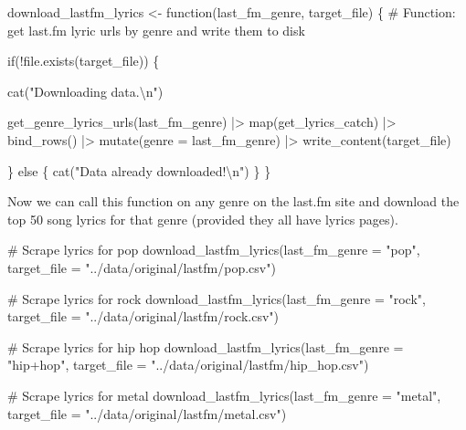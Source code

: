 \documentclass[
  letterpaper,
]{latex/krantz}
\newenvironment{Shaded}{\begin{snugshade}}{\end{snugshade}}
\newcommand{\AttributeTok}[1]{\textcolor[rgb]{0.40,0.45,0.13}{#1}}
\newcommand{\CommentTok}[1]{\textcolor[rgb]{0.37,0.37,0.37}{#1}}
\newcommand{\ControlFlowTok}[1]{\textcolor[rgb]{0.00,0.23,0.31}{#1}}
\newcommand{\FunctionTok}[1]{\textcolor[rgb]{0.28,0.35,0.67}{#1}}
\newcommand{\NormalTok}[1]{\textcolor[rgb]{0.00,0.23,0.31}{#1}}
\newcommand{\OtherTok}[1]{\textcolor[rgb]{0.00,0.23,0.31}{#1}}
\newcommand{\SpecialCharTok}[1]{\textcolor[rgb]{0.37,0.37,0.37}{#1}}
\newcommand{\StringTok}[1]{\textcolor[rgb]{0.13,0.47,0.30}{#1}}
\begin{document}
\begin{Shaded}
\begin{Highlighting}[]
\NormalTok{download\_lastfm\_lyrics }\OtherTok{\textless{}{-}} \ControlFlowTok{function}\NormalTok{(last\_fm\_genre, target\_file) \{}
  \CommentTok{\# Function: get last.fm lyric urls by genre and write them to disk}
  
  \ControlFlowTok{if}\NormalTok{(}\SpecialCharTok{!}\FunctionTok{file.exists}\NormalTok{(target\_file)) \{}
    
    \FunctionTok{cat}\NormalTok{(}\StringTok{"Downloading data.}\SpecialCharTok{\textbackslash{}n}\StringTok{"}\NormalTok{)}
    
    \FunctionTok{get\_genre\_lyrics\_urls}\NormalTok{(last\_fm\_genre) }\SpecialCharTok{|\textgreater{}} 
      \FunctionTok{map}\NormalTok{(get\_lyrics\_catch) }\SpecialCharTok{|\textgreater{}} 
      \FunctionTok{bind\_rows}\NormalTok{() }\SpecialCharTok{|\textgreater{}} 
      \FunctionTok{mutate}\NormalTok{(}\AttributeTok{genre =}\NormalTok{ last\_fm\_genre) }\SpecialCharTok{|\textgreater{}} 
      \FunctionTok{write\_content}\NormalTok{(target\_file)}
    
\NormalTok{  \} }\ControlFlowTok{else}\NormalTok{ \{}
    \FunctionTok{cat}\NormalTok{(}\StringTok{"Data already downloaded!}\SpecialCharTok{\textbackslash{}n}\StringTok{"}\NormalTok{)}
\NormalTok{  \}}
\NormalTok{\}}
\end{Highlighting}
\end{Shaded}

Now we can call this function on any genre on the last.fm site and
download the top 50 song lyrics for that genre (provided they all have
lyrics pages).

\begin{Shaded}
\begin{Highlighting}[]
\CommentTok{\# Scrape lyrics for \textquotesingle{}pop\textquotesingle{}}
\FunctionTok{download\_lastfm\_lyrics}\NormalTok{(}\AttributeTok{last\_fm\_genre =} \StringTok{"pop"}\NormalTok{, }\AttributeTok{target\_file =} \StringTok{"../data/original/lastfm/pop.csv"}\NormalTok{)}

\CommentTok{\# Scrape lyrics for \textquotesingle{}rock\textquotesingle{}}
\FunctionTok{download\_lastfm\_lyrics}\NormalTok{(}\AttributeTok{last\_fm\_genre =} \StringTok{"rock"}\NormalTok{, }\AttributeTok{target\_file =} \StringTok{"../data/original/lastfm/rock.csv"}\NormalTok{)}

\CommentTok{\# Scrape lyrics for \textquotesingle{}hip hop\textquotesingle{}}
\FunctionTok{download\_lastfm\_lyrics}\NormalTok{(}\AttributeTok{last\_fm\_genre =} \StringTok{"hip+hop"}\NormalTok{, }\AttributeTok{target\_file =} \StringTok{"../data/original/lastfm/hip\_hop.csv"}\NormalTok{)}

\CommentTok{\# Scrape lyrics for \textquotesingle{}metal\textquotesingle{}}
\FunctionTok{download\_lastfm\_lyrics}\NormalTok{(}\AttributeTok{last\_fm\_genre =} \StringTok{"metal"}\NormalTok{, }\AttributeTok{target\_file =} \StringTok{"../data/original/lastfm/metal.csv"}\NormalTok{)}
\end{Highlighting}
\end{Shaded}
\end{document}
